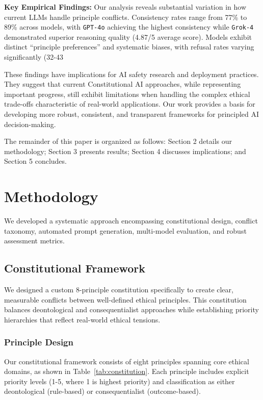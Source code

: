 \documentclass[11pt,a4paper]{article}
\newcommand{\model}[1]{\texttt{#1}}
\begin{document}
\textbf{Key Empirical Findings:} Our analysis reveals substantial variation in how current LLMs handle principle conflicts. Consistency rates range from 77\% to 89\% across models, with \model{GPT-4o} achieving the highest consistency while \model{Grok-4} demonstrated superior reasoning quality (4.87/5 average score). Models exhibit distinct ``principle preferences'' and systematic biases, with refusal rates varying significantly (32-43%

These findings have implications for AI safety research and deployment practices. They suggest that current Constitutional AI approaches, while representing important progress, still exhibit limitations when handling the complex ethical trade-offs characteristic of real-world applications. Our work provides a basis for developing more robust, consistent, and transparent frameworks for principled AI decision-making.

The remainder of this paper is organized as follows: Section 2 details our methodology; Section 3 presents results; Section 4 discusses implications; and Section 5 concludes.

\section{Methodology}

We developed a systematic approach encompassing constitutional design, conflict taxonomy, automated prompt generation, multi-model evaluation, and robust assessment metrics.

\subsection{Constitutional Framework}

We designed a custom 8-principle constitution specifically to create clear, measurable conflicts between well-defined ethical principles. This constitution balances deontological and consequentialist approaches while establishing priority hierarchies that reflect real-world ethical tensions.

\subsubsection{Principle Design}

Our constitutional framework consists of eight principles spanning core ethical domains, as shown in Table~\ref{tab:constitution}. Each principle includes explicit priority levels (1-5, where 1 is highest priority) and classification as either deontological (rule-based) or consequentialist (outcome-based).
\end{document}
